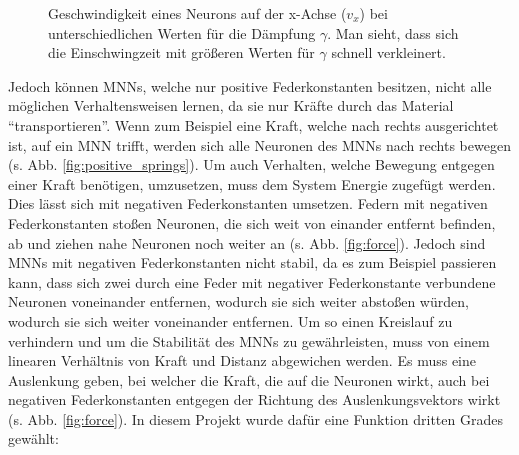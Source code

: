 \begin{figure}[htbp!]
    \centering
    \Data
    \caption{Geschwindigkeit eines Neurons auf der x-Achse ($v_x$) bei unterschiedlichen Werten für die Dämpfung $\gamma$. Man sieht, dass sich die Einschwingzeit mit größeren Werten für $\gamma$ schnell verkleinert.
    }
    \label{fig:dämpfung}
\end{figure}

Jedoch können MNNs, welche nur positive Federkonstanten besitzen, nicht alle möglichen Verhaltensweisen lernen, da sie nur Kräfte durch das Material \enquote{transportieren}.
Wenn zum Beispiel eine Kraft, welche nach rechts ausgerichtet ist, auf ein MNN trifft, werden sich alle Neuronen des MNNs nach rechts bewegen (s. Abb. \ref{fig:positive_springs}).
Um auch Verhalten, welche Bewegung entgegen einer Kraft benötigen, umzusetzen, muss dem System Energie zugefügt werden. Dies lässt sich mit negativen Federkonstanten umsetzen. 
Federn mit negativen Federkonstanten stoßen Neuronen, die sich weit von einander entfernt befinden, ab und ziehen nahe Neuronen noch weiter an (s. Abb. \ref{fig:force}).
Jedoch sind MNNs mit negativen Federkonstanten nicht stabil, da es zum Beispiel passieren kann, dass sich zwei durch eine Feder mit negativer Federkonstante verbundene Neuronen voneinander entfernen, wodurch sie sich weiter abstoßen würden, wodurch sie sich weiter voneinander entfernen.
Um so einen Kreislauf zu verhindern und um die Stabilität des MNNs zu gewährleisten, muss von einem linearen Verhältnis von Kraft und Distanz abgewichen werden.
Es muss eine Auslenkung geben, bei welcher die Kraft, die auf die Neuronen wirkt, auch bei negativen Federkonstanten entgegen der Richtung des Auslenkungsvektors wirkt (s. Abb. \ref{fig:force}). In diesem Projekt wurde dafür eine Funktion dritten Grades gewählt:

